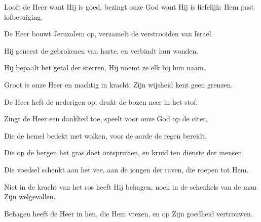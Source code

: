 \documentclass[12pt,twoside,a5paper]{article}
\begin{document}
\begin{halfparskip}
  Looft de Heer want Hij is goed, bezingt onze God want Hij is liefelijk: Hem past lofbetuiging.


  De Heer bouwt Jeruzalem op, verzamelt de verstrooiden van Israël.

  Hij geneest de gebrokenen van harte, en verbindt hun wonden.

  Hij bepaalt het getal der sterren, Hij noemt ze elk bij hun naam.

  Groot is onze Heer en machtig in kracht; Zijn wijsheid kent geen grenzen.

  De Heer heft de nederigen op, drukt de bozen neer in het stof.

  Zingt de Heer een danklied toe, speelt voor onze God op de citer,

  Die de hemel bedekt met wolken, voor de aarde de regen bereidt,

  Die op de bergen het gras doet ontspruiten, en kruid ten dienste der mensen,

  Die voedsel schenkt aan het vee, aan de jongen der raven, die roepen tot Hem.

  Niet in de kracht van het ros heeft Hij behagen, noch in de schenkels van de man Zijn welgevallen.

  Behagen heeft de Heer in hen, die Hem vrezen, en op Zijn goedheid vertrouwen.
\end{halfparskip}



\end{document}
